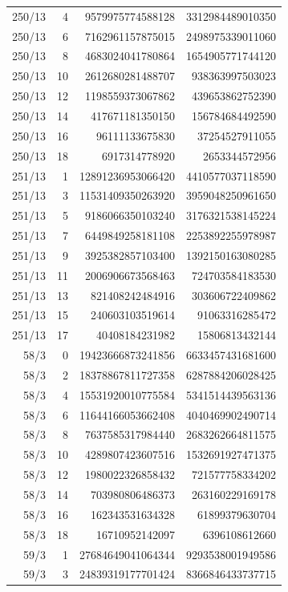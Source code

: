 \begin{longtable}{@{}rrrr@{}}
250/13 & 4 & 9579975774588128 & 3312984489010350\\
250/13 & 6 & 7162961157875015 & 2498975339011060\\
250/13 & 8 & 4683024041780864 & 1654905771744120\\
250/13 & 10 & 2612680281488707 & 938363997503023\\
250/13 & 12 & 1198559373067862 & 439653862752390\\
250/13 & 14 & 417671181350150 & 156784684492590\\
250/13 & 16 & 96111133675830 & 37254527911055\\
250/13 & 18 & 6917314778920 & 2653344572956\\
251/13 & 1 & 12891236953066420 & 4410577037118590\\
251/13 & 3 & 11531409350263920 & 3959048250961650\\
251/13 & 5 & 9186066350103240 & 3176321538145224\\
251/13 & 7 & 6449849258181108 & 2253892255978987\\
251/13 & 9 & 3925382857103400 & 1392150163080285\\
251/13 & 11 & 2006906673568463 & 724703584183530\\
251/13 & 13 & 821408242484916 & 303606722409862\\
251/13 & 15 & 240603103519614 & 91063316285472\\
251/13 & 17 & 40408184231982 & 15806813432144\\
58/3 & 0 & 19423666873241856 & 6633457431681600\\
58/3 & 2 & 18378867811727358 & 6287884206028425\\
58/3 & 4 & 15531920010775584 & 5341514439563136\\
58/3 & 6 & 11644166053662408 & 4040469902490714\\
58/3 & 8 & 7637585317984440 & 2683262664811575\\
58/3 & 10 & 4289807423607516 & 1532691927471375\\
58/3 & 12 & 1980022326858432 & 721577758334202\\
58/3 & 14 & 703980806486373 & 263160229169178\\
58/3 & 16 & 162343531634328 & 61899379630704\\
58/3 & 18 & 16710952142097 & 6396108612660\\
59/3 & 1 & 27684649041064344 & 9293538001949586\\
59/3 & 3 & 24839319177701424 & 8366846433737715\\

\end{longtable}
